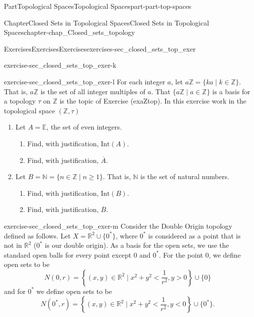 \documentclass[oneside,10pt,]{book}
\numberwithin{equation}{chapter}
\newcommand{\Z}{\mathbb{Z}}
\newcommand{\R}{\mathbb{R}}
\newcommand{\Int}{\text{Int}}
\newcommand{\lt}{<}
\newcommand{\gt}{>}
\begin{document}
\begin{partptx}{Part}{Topological Spaces}{}{Topological Spaces}{}{}{part-part-top-spaces}
\begin{chapterptx}{Chapter}{Closed Sets in Topological Spaces}{}{Closed Sets in Topological Spaces}{}{}{chapter-chap_Closed_sets_topology}
\begin{exercises-section}{Exercises}{Exercises}{}{Exercises}{}{}{exercises-sec_closed_sets_top_exer}
\begin{divisionexercise}{11}{}{}{exercise-sec_closed_sets_top_exer-k}
\end{divisionexercise}%
\begin{divisionexercise}{12}{}{}{exercise-sec_closed_sets_top_exer-l}%
For each integer \(a\), let \(a\Z = \{ka \mid k \in \Z\}\). That is, \(a\Z\) is the set of all integer multiples of \(a\). That \(\{a\Z \mid a \in \Z\}\) is a basis for a topology \(\tau\) on \(\Z\) is the topic of Exercise (ex\textunderscore{}aZ\textunderscore{}top). In this exercise work in the topological space \((\Z, \tau)\)%
\begin{enumerate}[font=\bfseries,label=(\alph*),ref=\alph*]%
\item{}Let \(A = \mathbb{E}\), the set of even integers.%
\begin{enumerate}[font=\bfseries,label=(\roman*),ref=\theenumi.\roman*]%
\item{}Find, with justification, \(\Int(A)\).%
\item{}Find, with justification, \(\overline{A}\).%
\end{enumerate}%
\item{}Let \(B = \mathbb{N} = \{n \in \Z \mid n \geq 1\}\). That is, \(\mathbb{N}\) is the set of natural numbers.%
\begin{enumerate}[font=\bfseries,label=(\roman*),ref=\theenumi.\roman*]%
\item{}Find, with justification, \(\Int(B)\).%
\item{}Find, with justification, \(\overline{B}\).%
\end{enumerate}%
\end{enumerate}%
\end{divisionexercise}%
\begin{divisionexercise}{13}{}{}{exercise-sec_closed_sets_top_exer-m}%
Consider the Double Origin topology defined as follows. Let \(X = \R^2 \cup \{0^*\}\), where \(0^*\) is considered as a point that is not in \(\R^2\) (\(0^*\) is our double origin). As a basis for the open sets, we use the standard open balls for every point except \(0\) and \(0^*\). For the point \(0\), we define open sets to be%
\begin{equation*}
N(0,r) = \left\{(x,y) \in \R^2 \mid x^2+y^2 \lt  \frac{1}{r^2}, y \gt 0\right\}  \cup \{0\}
\end{equation*}
and for \(0^*\) we define open sets to be%
\begin{equation*}
N(0^*, r) =  \left\{(x,y) \in \R^2 \mid x^2+y^2 \lt  \frac{1}{r^2}, y \lt  0\right\}  \cup \{0^*\}\text{.}
\end{equation*}

\end{divisionexercise}
\end{exercises-section}
\end{chapterptx}
\end{partptx}
\end{document}
